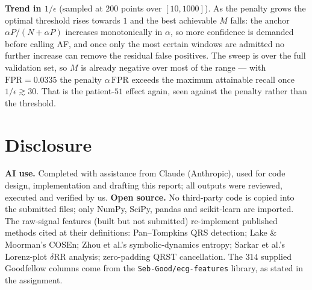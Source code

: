 \documentclass[10pt,a4paper]{article}
\begin{document}
\textbf{Trend in $1/\epsilon$} (sampled at $200$ points over $[10,1000]$). As the
penalty grows the optimal threshold rises towards $1$ and the best achievable $M$
falls: the anchor $\alpha P/(N + \alpha P)$ increases monotonically in $\alpha$,
so more confidence is demanded before calling AF, and once only the most certain
windows are admitted no further increase can remove the residual false positives.
The sweep is over the full validation set, so $M$ is already negative over most of
the range --- with $\mathrm{FPR} = 0.0335$ the penalty $\alpha\,\mathrm{FPR}$
exceeds the maximum attainable recall once $1/\epsilon \gtrsim 30$. That is the
patient-$51$ effect again, seen against the penalty rather than the threshold.

\section*{Disclosure}

\textbf{AI use.} Completed with assistance from Claude (Anthropic), used for code
design, implementation and drafting this report; all outputs were reviewed,
executed and verified by us. \textbf{Open source.} No third-party code is copied
into the submitted files; only NumPy, SciPy, pandas and scikit-learn are
imported. The raw-signal features (built but not submitted) re-implement
published methods cited at their definitions: Pan--Tompkins QRS detection; Lake
\& Moorman's COSEn; Zhou et al.'s symbolic-dynamics entropy; Sarkar et al.'s
Lorenz-plot $\delta$RR analysis; zero-padding QRST cancellation. The $314$
supplied Goodfellow columns come from the \texttt{Seb-Good/ecg-features} library,
as stated in the assignment.
\end{document}
